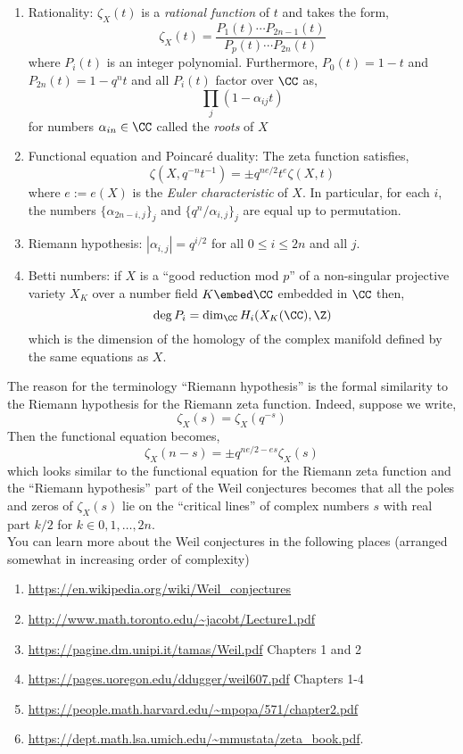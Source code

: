 \documentclass[12pt]{article}
\begin{document}
\begin{enumerate}
\item Rationality: $\zeta_X(t)$ is a \textit{rational function} of $t$ and takes the form,
\[ \zeta_X(t) = \frac{P_1(t) \cdots P_{2n-1}(t)}{P_p(t) \cdots P_{2n}(t)} \]
where $P_i(t)$ is an integer polynomial. Furthermore, $P_0(t) = 1 - t$ and $P_{2n}(t) = 1 - q^n t$ and all $P_i(t)$ factor over $\CC$ as,
\[ \prod_j (1 - \alpha_{ij} t) \]
for numbers $\alpha_{in} \in \CC$ called the \textit{roots} of $X$

\item Functional equation and Poincar\'{e} duality: The zeta function satisfies,
\[ \zeta(X, q^{-n} t^{-1}) = \pm q^{ne/2} t^e \zeta(X, t) \]
where $e := e(X)$ is the \textit{Euler characteristic} of $X$. In particular, for each $i$, the numbers $\{ \alpha_{2n - i, j} \}_j$ and $\{ q^n / \alpha_{i,j} \}_j$ are equal up to permutation.

\item Riemann hypothesis: $|\alpha_{i,j}| = q^{i/2}$ for all $0 \le i \le 2n$ and all $j$.

\item Betti numbers: if $X$ is a ``good reduction mod $p$'' of a non-singular projective variety $X_K$ over a number field $K \embed \CC$ embedded in $\CC$ then,
\[ \deg{P_i} = \dim_{\CC} H_i(X_K(\CC), \Z) \]
which is the dimension of the homology of the complex manifold defined by the same equations as $X$.
\end{enumerate}

The reason for the terminology ``Riemann hypothesis'' is the formal similarity to the Riemann hypothesis for the Riemann zeta function. Indeed, suppose we write,
\[ \zeta_X(s) = \zeta_X(q^{-s}) \]
Then the functional equation becomes,
\[ \zeta_X(n-s) = \pm q^{ne/2 - e s} \zeta_X(s) \]
which looks similar to the functional equation for the Riemann zeta function and the ``Riemann hypothesis'' part of the Weil conjectures becomes that all the poles and zeros of $\zeta_X(s)$ lie on the ``critical lines'' of complex numbers $s$ with real part $k/2$ for $k \in 0,1,\dots,2n$. 
\bigskip\\
You can learn more about the Weil conjectures in the following places (arranged somewhat in increasing order of complexity)
\begin{enumerate}
\item \url{https://en.wikipedia.org/wiki/Weil_conjectures}
\item \url{http://www.math.toronto.edu/~jacobt/Lecture1.pdf}
\item \url{https://pagine.dm.unipi.it/tamas/Weil.pdf} Chapters 1 and 2
\item \url{https://pages.uoregon.edu/ddugger/weil607.pdf} Chapters 1-4
\item \url{https://people.math.harvard.edu/~mpopa/571/chapter2.pdf}
\item \url{https://dept.math.lsa.umich.edu/~mmustata/zeta_book.pdf}.
\end{enumerate}
\end{document}
